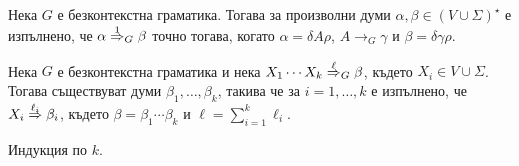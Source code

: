 \begin{proposition}\label{pr:grammar:derive-one-step}
  Нека $G$ е безконтекстна граматика.
  Тогава за произволни думи $\alpha,\beta \in (V\cup\Sigma)^\star$ е изпълнено, че 
  $\alpha \stackrel{{1}}{\Rightarrow}_G \beta$ точно тогава, когато $\alpha = \delta A \rho$, $A \to_G \gamma$ и $\beta = \delta\gamma\rho$.
\end{proposition}

\begin{proposition}\label{pr:grammar:divide}
  Нека $G$ е безконтекстна граматика и нека $X_1\cdots X_k \stackrel{{\ell}}{\Rightarrow}_G \beta$, където $X_i \in V \cup \Sigma$.
  Тогава съществуват думи $\beta_1,\dots,\beta_k$, такива че за $i = 1,\dots, k$ е изпълнено, че
  $X_i \stackrel{{\ell_i}}{\Rightarrow} \beta_i$, където $\beta = \beta_1\cdots \beta_k$ и $\ell = \sum^k_{i = 1}\ell_i$.
\end{proposition}
\begin{hint}
  Индукция по $k$.
\end{hint}



